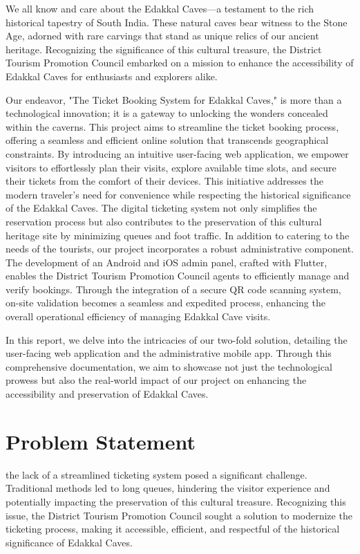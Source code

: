 \documentclass[12pt,a4paper]{report}
\begin{document}
We all know and care about the Edakkal Caves—a testament to the rich historical tapestry of South India. These natural caves bear witness to the Stone Age, adorned with rare carvings that stand as unique relics of our ancient heritage. Recognizing the significance of this cultural treasure, the District Tourism Promotion Council embarked on a mission to enhance the accessibility of Edakkal Caves for enthusiasts and explorers alike.

Our endeavor, "The Ticket Booking System for Edakkal Caves," is more than a technological innovation; it is a gateway to unlocking the wonders concealed within the caverns. This project aims to streamline the ticket booking process, offering a seamless and efficient online solution that transcends geographical constraints. By introducing an intuitive user-facing web application, we empower visitors to effortlessly plan their visits, explore available time slots, and secure their tickets from the comfort of their devices.
This initiative addresses the modern traveler's need for convenience while respecting the historical significance of the Edakkal Caves. The digital ticketing system not only simplifies the reservation process but also contributes to the preservation of this cultural heritage site by minimizing queues and foot traffic.
In addition to catering to the needs of the tourists, our project incorporates a robust administrative component. The development of an Android and iOS admin panel, crafted with Flutter, enables the District Tourism Promotion Council agents to efficiently manage and verify bookings. Through the integration of a secure QR code scanning system, on-site validation becomes a seamless and expedited process, enhancing the overall operational efficiency of managing Edakkal Cave visits.

In this report, we delve into the intricacies of our two-fold solution, detailing the user-facing web application and the administrative mobile app. Through this comprehensive documentation, we aim to showcase not just the technological prowess but also the real-world impact of our project on enhancing the accessibility and preservation of Edakkal Caves.

\section{Problem Statement}

the lack of a streamlined ticketing system posed a significant challenge. Traditional methods led to long queues, hindering the visitor experience and potentially impacting the preservation of this cultural treasure. Recognizing this issue, the District Tourism Promotion Council sought a solution to modernize the ticketing process, making it accessible, efficient, and respectful of the historical significance of Edakkal Caves.
\end{document}
